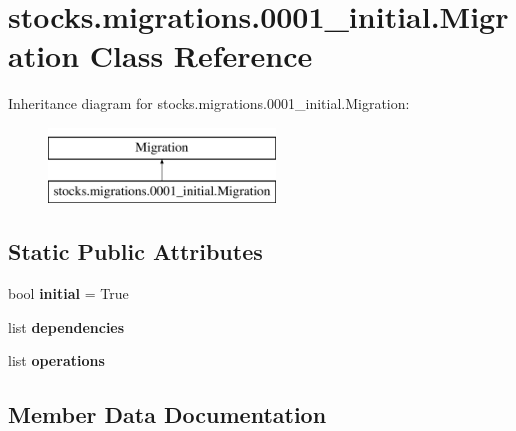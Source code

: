 \hypertarget{classstocks_1_1migrations_1_10001__initial_1_1_migration}{}\section{stocks.\+migrations.0001\+\_\+initial.Migration Class Reference}
\label{classstocks_1_1migrations_1_10001__initial_1_1_migration}
Inheritance diagram for stocks.\+migrations.0001\+\_\+initial.Migration\+:\begin{figure}[H]
\begin{center}
\leavevmode
\includegraphics[height=2.000000cm]{classstocks_1_1migrations_1_10001__initial_1_1_migration}
\end{center}
\end{figure}
\subsection*{Static Public Attributes}
\begin{DoxyCompactItemize}
\item 
\mbox{\label{classstocks_1_1migrations_1_10001__initial_1_1_migration_afc1023a8bab2daff2911fe5db9cba6aa}} 
bool {\bfseries initial} = True
\item 
list {\bfseries dependencies}
\item 
list {\bfseries operations}
\end{DoxyCompactItemize}


\subsection{Member Data Documentation}
\mbox{\label{classstocks_1_1migrations_1_10001__initial_1_1_migration_a816085cec6cdb4a96f07c835b9dc5c1e}} 
